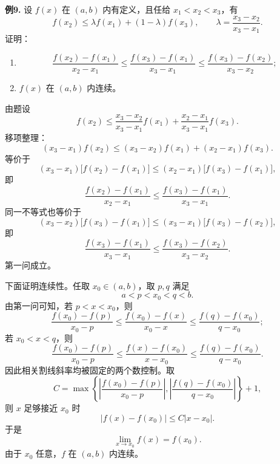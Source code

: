 \begin{problemblock}
\textbf{例9.} 设 \(f(x)\) 在 \((a,b)\) 内有定义，且任给 \(x_1<x_2<x_3\)，有
\[
f(x_2)\le \lambda f(x_1)+(1-\lambda)f(x_3),
\qquad
\lambda=\frac{x_3-x_2}{x_3-x_1}.
\]
证明：
\begin{enumerate}[label=(\arabic*), leftmargin=2.2em]
\item
\[
\frac{f(x_2)-f(x_1)}{x_2-x_1}
\le
\frac{f(x_3)-f(x_1)}{x_3-x_1}
\le
\frac{f(x_3)-f(x_2)}{x_3-x_2};
\]
\item \(f(x)\) 在 \((a,b)\) 内连续。
\end{enumerate}
\end{problemblock}
\begin{solutionblock}
由题设
\[
f(x_2)\le
\frac{x_3-x_2}{x_3-x_1}f(x_1)
+\frac{x_2-x_1}{x_3-x_1}f(x_3).
\]
移项整理：
\[
(x_3-x_1)f(x_2)
\le (x_3-x_2)f(x_1)+(x_2-x_1)f(x_3).
\]
等价于
\[
(x_3-x_1)\bigl[f(x_2)-f(x_1)\bigr]
\le
(x_2-x_1)\bigl[f(x_3)-f(x_1)\bigr],
\]
即
\[
\frac{f(x_2)-f(x_1)}{x_2-x_1}
\le
\frac{f(x_3)-f(x_1)}{x_3-x_1}.
\]
同一不等式也等价于
\[
(x_3-x_2)\bigl[f(x_3)-f(x_1)\bigr]
\le
(x_3-x_1)\bigl[f(x_3)-f(x_2)\bigr],
\]
即
\[
\frac{f(x_3)-f(x_1)}{x_3-x_1}
\le
\frac{f(x_3)-f(x_2)}{x_3-x_2}.
\]
第一问成立。

下面证明连续性。任取 \(x_0\in(a,b)\)，取 \(p,q\) 满足
\[
a<p<x_0<q<b.
\]
由第一问可知，若 \(p<x<x_0\)，则
\[
\frac{f(x_0)-f(p)}{x_0-p}
\le
\frac{f(x_0)-f(x)}{x_0-x}
\le
\frac{f(q)-f(x_0)}{q-x_0};
\]
若 \(x_0<x<q\)，则
\[
\frac{f(x_0)-f(p)}{x_0-p}
\le
\frac{f(x)-f(x_0)}{x-x_0}
\le
\frac{f(q)-f(x_0)}{q-x_0}.
\]
因此相关割线斜率均被固定的两个数控制。取
\[
C=\max\left\{
\left|\frac{f(x_0)-f(p)}{x_0-p}\right|,
\left|\frac{f(q)-f(x_0)}{q-x_0}\right|
\right\}+1,
\]
则 \(x\) 足够接近 \(x_0\) 时
\[
|f(x)-f(x_0)|\le C|x-x_0|.
\]
于是
\[
\lim_{x\to x_0}f(x)=f(x_0).
\]
由于 \(x_0\) 任意，\(f\) 在 \((a,b)\) 内连续。
\end{solutionblock}

